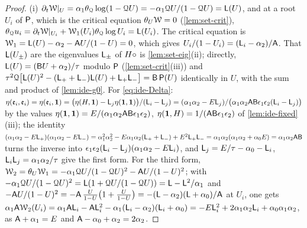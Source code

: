 \begin{proof}
(i) $\partial_t\mathcal{W}|_U=\alpha_1\theta_{\mathcal{Q}}\log(1-\mathcal{Q} U)=-\alpha_1\mathcal{Q} U/(1-\mathcal{Q} U)=\mathsf{L}(U)$, and at a root $U_i$ of $\mathsf{P}$, which is the critical equation $\theta_{U}\mathcal{W}=0$ (\cref{lem:set-crit}), $\theta_{\mathcal{Q}} u_i=\partial_t\mathcal{W}|_{U_i}+\mathcal{W}_1(U_i)\theta_{\mathcal{Q}}\log U_i=\mathsf{L}(U_i)$. The critical equation is $\mathcal{W}_1=\mathsf{L}(U)-\alpha_2-\mathsf{A} U/(1-U)=0$, which gives $U_i/(1-U_i)=(\mathsf{L}_i-\alpha_2)/\mathsf{A}$. That $\mathsf{L}(U_\pm)$ are the eigenvalues $\mathsf{L}_\pm$ of $H\circ$ is \cref{lem:set-eig}(ii); directly, $\mathsf{L}(U)=(\mathsf{B} U+\alpha_2)/\tau$ modulo $\mathsf{P}$ (\cref{lem:set-crit}(iii)) and $\tau^2\mathcal{Q}\big[\mathsf{L}(U)^2-(\mathsf{L}_++\mathsf{L}_-)\mathsf{L}(U)+\mathsf{L}_+\mathsf{L}_-\big]=\mathsf{B}\,\mathsf{P}(U)$ identically in $U$, with the sum and product of \cref{lem:ide-g0}. For \cref{eq:ide-Delta}: $\eta(\mathfrak{e}_i,\mathfrak{e}_i)=\eta(\mathfrak{e}_i,\mathbf{1})=\big(\eta(H,\mathbf{1})-\mathsf{L}_j\eta(\mathbf{1},\mathbf{1})\big)/(\mathsf{L}_i-\mathsf{L}_j)=(\alpha_1\alpha_2-E\mathsf{L}_j)/\big(\alpha_1\alpha_2\mathsf{A}\mathsf{B}\epsilon_1\epsilon_2(\mathsf{L}_i-\mathsf{L}_j)\big)$ by the values $\eta(\mathbf{1},\mathbf{1})=E/(\alpha_1\alpha_2\mathsf{A}\mathsf{B}\epsilon_1\epsilon_2)$, $\eta(\mathbf{1},H)=1/(\mathsf{A}\mathsf{B}\epsilon_1\epsilon_2)$ of \cref{lem:ide-fixed}(iii); the identity $(\alpha_1\alpha_2-E\mathsf{L}_+)(\alpha_1\alpha_2-E\mathsf{L}_-)=\alpha_1^2\alpha_2^2-E\alpha_1\alpha_2(\mathsf{L}_++\mathsf{L}_-)+E^2\mathsf{L}_+\mathsf{L}_-=\alpha_1\alpha_2(\alpha_1\alpha_2+\alpha_0E)=\alpha_1\alpha_2\mathsf{A}\mathsf{B}$ turns the inverse into $\epsilon_1\epsilon_2(\mathsf{L}_i-\mathsf{L}_j)(\alpha_1\alpha_2-E\mathsf{L}_i)$, and $\mathsf{L}_j=E/\tau-\alpha_0-\mathsf{L}_i$, $\mathsf{L}_i\mathsf{L}_j=\alpha_1\alpha_2/\tau$ give the first form. For the third form, $\mathcal{W}_2=\theta_{U}\mathcal{W}_1=-\alpha_1\mathcal{Q} U/(1-\mathcal{Q} U)^2-\mathsf{A} U/(1-U)^2$; with $-\alpha_1\mathcal{Q} U/(1-\mathcal{Q} U)^2=\mathsf{L}(1+\mathcal{Q} U/(1-\mathcal{Q} U))=\mathsf{L}-\mathsf{L}^2/\alpha_1$ and $-\mathsf{A} U/(1-U)^2=-\mathsf{A}\,\frac{U}{1-U}\big(1+\frac{U}{1-U}\big)=-(\mathsf{L}-\alpha_2)(\mathsf{L}+\alpha_0)/\mathsf{A}$ at $U_i$, one gets $\alpha_1\mathsf{A}\mathcal{W}_2(U_i)=\alpha_1\mathsf{A}\mathsf{L}_i-\mathsf{A}\mathsf{L}_i^2-\alpha_1(\mathsf{L}_i-\alpha_2)(\mathsf{L}_i+\alpha_0)=-E\mathsf{L}_i^2+2\alpha_1\alpha_2\mathsf{L}_i+\alpha_0\alpha_1\alpha_2$, as $\mathsf{A}+\alpha_1=E$ and $\mathsf{A}-\alpha_0+\alpha_2=2\alpha_2$. 


\end{proof}
